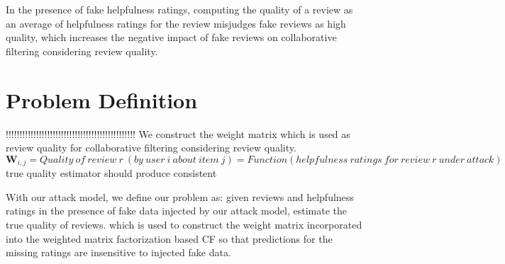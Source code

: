 \documentclass[master,english,final]{kaist-ucs}
\begin{document}
In the presence of fake helpfulness ratings, computing the quality of a review as an average of helpfulness ratings for the review misjudges fake reviews as high quality, which increases the negative impact of fake reviews on collaborative filtering considering review quality.

\section{Problem Definition}
!!!!!!!!!!!!!!!!!!!!!!!!!!!!!!!!!!!!!!!!!!!!!!!
We construct the weight matrix which is used as review quality for collaborative filtering considering review quality.
\begin{equation}
\bm{W}_{i,j}=Quality\ of\ review\ r\ (by\ user\ i\ about\ item\ j)=Function(helpfulness\ ratings\ for\ review\ r\ under\ attack)
\end{equation}
true quality estimator should produce consistent

With our attack model, we define our problem as: given reviews and helpfulness ratings in the presence of fake data injected by our attack model, estimate the true quality of reviews.
which is used to construct the weight matrix
incorporated into the weighted matrix factorization based CF so that predictions for the missing ratings are insensitive to injected fake data.
\end{document}
